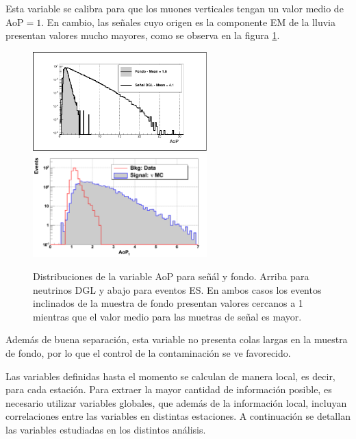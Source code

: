 \begin{itemize}
\begin{figure}[ht!]
\begin{center}
		\end{center}
	 \end{figure}
	 Esta variable se calibra para que los muones verticales tengan un valor medio de AoP$=1$.
	 En cambio, las señales cuyo origen es la componente EM de la lluvia presentan valores mucho mayores, como se observa en la figura \ref{fig:aopDist}.
	 \begin{figure}[ht!]
		\begin{center}
		\includegraphics[width=0.6\textwidth]{fig/seleccionAuger/aopDGL} \\
		\includegraphics[width=0.6\textwidth]{fig/seleccionAuger/aop_forThesis}
		\caption{Distribuciones de la variable AoP para señál y fondo. Arriba para neutrinos DGL y abajo para eventos ES. En ambos casos los eventos inclinados de la muestra de fondo presentan valores cercanos a 1 mientras que el valor medio para las muetras de señal es mayor.}
		\label{fig:aopDist}
		\end{center}
	 \end{figure}
	 Además de buena separación, esta variable no presenta colas largas en la muestra de fondo, por lo que el control de la contaminación se ve favorecido.
	\end{itemize}
	
	Las variables definidas hasta el momento se calculan de manera local, es decir, para cada estación.
	Para extraer la mayor cantidad de información posible, es necesario utilizar variables globales, que además de la información local, incluyan correlaciones entre las variables en distintas estaciones.
	A continuación se detallan las variables estudiadas en los distintos análisis.
	
